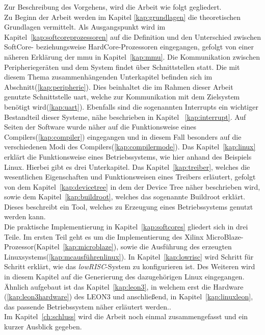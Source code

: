 Zur Beschreibung des Vorgehens, wird die Arbeit wie folgt gegliedert.\\
 Zu Beginn der Arbeit werden im Kapitel \ref{kap:grundlagen} die theoretischen Grundlagen vermittelt. Als
Ausgangspunkt wird im Kapitel~\ref{kap:softcoreprozessoren} auf die Definition und den Unterschied zwischen SoftCore- beziehungsweise HardCore-Prozessoren eingegangen,
gefolgt von einer näheren Erklärung der \ac{mmu} in Kapitel~\ref{kap:mmu}. Die Kommunikation zwischen
Peripheriegeräten und dem System findet über Schnittstellen statt. Die mit diesem Thema zusammenhängenden
Unterkapitel befinden sich im Abschnitt(\ref{kap:peripherie}).
Dies beinhaltet die im Rahmen dieser Arbeit genutzte Schnittstelle \ac{uart}, welche zur Kommunikation mit dem
Zielsystem benötigt wird(\ref{kap:uart}). Ebenfalls sind die sogenannten Interrupts ein wichtiger
Bestandteil dieser Systeme, nähe beschrieben in Kapitel ~\ref{kap:interrupt}.
Auf Seiten der Software wurde näher auf die Funktionsweise eines Compilers(\ref{kap:compiler}) eingegangen und in diesem Fall
besonders auf die verschiedenen Modi des Compilers(\ref{kap:compilermode}).
Das Kapitel~\ref{kap:linux} erklärt die
Funktionsweise eines Betriebssystems, wie hier anhand des Beispiels Linux. Hierbei gibt es drei Unterkapitel.
Das Kapitel~\ref{kap:treiber}, welches die wesentlichen Eigenschaften und Funktionsweisen
eines Treibers erläutert, gefolgt von dem Kapitel~\ref{kap:devicetree} in dem der Device Tree näher beschrieben wird, sowie dem Kapitel~\ref{kap:buildroot}, welches das sogenannte Buildroot erklärt.
Dieses beschreibt ein Tool, welches zu Erzeugung
eines Betriebssystems genutzt werden kann.\\
Die praktische Implementierung in Kapitel~\ref{kap:softcores} gliedert sich in drei Teile.
Im ersten Teil geht es um die Implementierung des Xilinx MicroBlaze-Prozessor(Kapitel~\ref{kap:microblaze}),
sowie die Ausführung des erzeugten Linuxsystems(\ref{kap:mcausführenlinux}).
In Kapitel~\ref{kap:lowrisc} wird Schritt für Schritt erklärt, wie das \emph{lowRISC}-System zu konfigurieren ist. Des Weiteren wird
in diesem Kapitel auf die Generierung des dazugehörigen Linux eingegangen. Ähnlich aufgebaut ist das Kapitel~\ref{kap:leon3}, in welchem
erst die Hardware (\ref{kap:leon3hardware}) des LEON3 und anschließend, in Kapitel~\ref{kap:linuxleon}, das passende Betriebssystem näher erläutert werden..\\
Im Kapitel~\ref{ch:schluss} wird die Arbeit noch einmal zusammengefasst und ein kurzer Ausblick gegeben.\\
